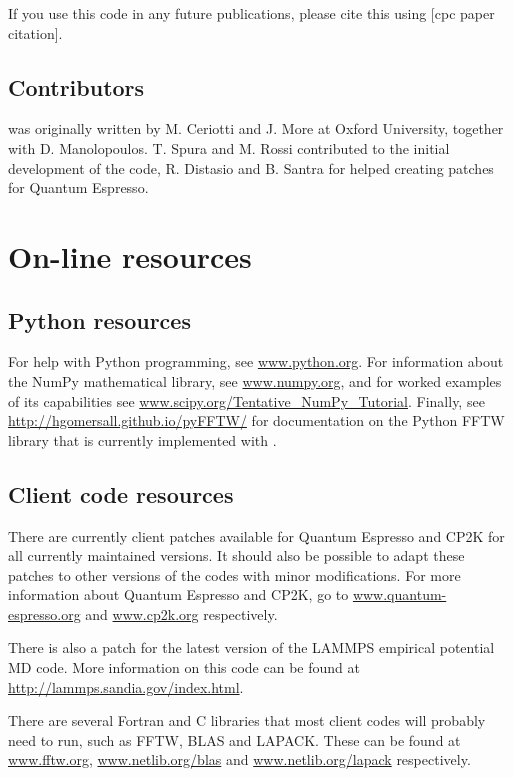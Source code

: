 \documentclass[11pt,english,fleqn]{report}
\begin{document}
If you use this code in any
future publications, please cite this using {[}cpc paper citation{]}.

\subsection{Contributors}

\ipi was originally written by M. Ceriotti and J. More at Oxford University,
together with D. Manolopoulos. T. Spura and M. Rossi contributed to the 
initial development of the code, R. Distasio and B. Santra for helped creating patches for
Quantum Espresso.



\section{On-line resources}


\subsection{Python resources}

For help with Python programming, see \url{www.python.org}. For information
about the NumPy mathematical library, see \url{www.numpy.org}, and
for worked examples of its capabilities see \url{www.scipy.org/Tentative_NumPy_Tutorial}.
Finally, see \url{http://hgomersall.github.io/pyFFTW/} for documentation
on the Python FFTW library that is currently implemented with \ipi.


\subsection{Client code resources}

\label{librarywebsites}

There are currently client patches available for Quantum Espresso
and CP2K for all currently maintained versions. It should also 
be possible to adapt these patches
to other versions of the codes with minor modifications. For more
information about Quantum Espresso and CP2K, go to \url{www.quantum-espresso.org}
and \url{www.cp2k.org} respectively.

There is also a patch for the latest version of the LAMMPS empirical potential MD code.
More information on this code can be found at \url{http://lammps.sandia.gov/index.html}.

There are several Fortran and C libraries that most client codes will
probably need to run, such as FFTW, BLAS and LAPACK. These can be
found at \url{www.fftw.org}, \url{www.netlib.org/blas} and \url{www.netlib.org/lapack}
respectively.
\end{document}
